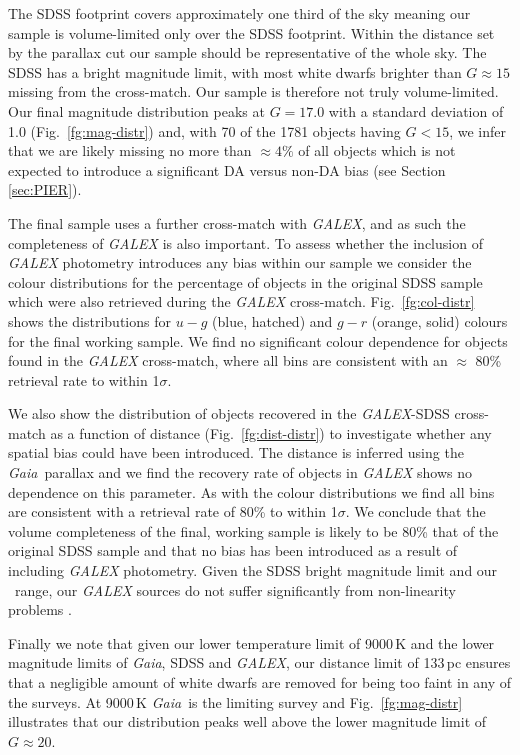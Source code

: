 \documentclass[a4paper,fleqn,usenatbib]{mnras}
\newcommand{\gaia}{{\it Gaia}}
\begin{document}
The SDSS footprint covers approximately one third of the sky meaning our sample is volume-limited only over the SDSS footprint. Within the distance set by the parallax cut our sample should be representative of the whole sky. The SDSS has a bright magnitude limit, with most white dwarfs brighter than $G \approx 15$ missing from the cross-match. Our sample is therefore not truly volume-limited. Our final magnitude distribution peaks at $G = 17.0$ with a standard deviation of 1.0 (Fig.~\ref{fg:mag-distr}) and, with 70 of the 1781 objects having $G<15$, we infer that we are likely missing no more than $\approx 4\%$ of all objects which is not expected to introduce a significant DA versus non-DA bias (see Section\,\ref{sec:PIER}).

The final sample uses a further cross-match with {\it GALEX}, and as such the completeness of {\it GALEX} is also important. To assess whether the inclusion of {\it GALEX} photometry introduces any bias within our sample we consider the colour distributions for the percentage of objects in the original SDSS sample which were also retrieved during the {\it GALEX} cross-match. Fig.~\ref{fg:col-distr} shows the distributions for $u-g$ (blue, hatched) and $g-r$ (orange, solid) colours for the final working sample. We find no significant colour dependence for objects found in the {\it GALEX} cross-match, where all bins are consistent with an $\approx$ 80\% retrieval rate to within 1$\sigma$.

We also show the distribution of objects recovered in the {\it GALEX}-SDSS cross-match as a function of distance (Fig.~\ref{fg:dist-distr}) to investigate whether any spatial bias could have been introduced. The distance is inferred using the \gaia\ parallax and we find the recovery rate of objects in {\it GALEX} shows no dependence on this parameter. As with the colour distributions we find all bins are consistent with a retrieval rate of 80\% to within 1$\sigma$. We conclude that the volume completeness of the final, working sample is likely to be 80\% that of the original SDSS sample and that no bias has been introduced as a result of including {\it GALEX} photometry. Given the SDSS bright magnitude limit and our \teff\ range, our {\it GALEX} sources do not suffer significantly from non-linearity problems \citep{camarota2014,wall2019}.

Finally we note that given our lower temperature limit of 9000\,K and the lower magnitude limits of \gaia, SDSS and {\it GALEX}, our distance limit of 133\,pc ensures that a negligible amount of white dwarfs are removed for being too faint in any of the surveys. At 9000\,K \gaia\ is the limiting survey and Fig.~\ref{fg:mag-distr} illustrates that our distribution peaks well above the lower magnitude limit of $G \approx 20$.
\end{document}

